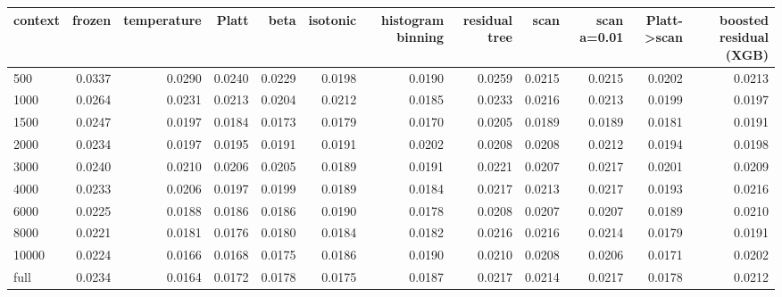 \begin{tabular}{lrrrrrrrrrrr}
\toprule
context & frozen & temperature & Platt & beta & isotonic & histogram binning & residual tree & scan & scan a=0.01 & Platt->scan & boosted residual (XGB) \\
\midrule
500 & 0.0337 & 0.0290 & 0.0240 & 0.0229 & 0.0198 & 0.0190 & 0.0259 & 0.0215 & 0.0215 & 0.0202 & 0.0213 \\
1000 & 0.0264 & 0.0231 & 0.0213 & 0.0204 & 0.0212 & 0.0185 & 0.0233 & 0.0216 & 0.0213 & 0.0199 & 0.0197 \\
1500 & 0.0247 & 0.0197 & 0.0184 & 0.0173 & 0.0179 & 0.0170 & 0.0205 & 0.0189 & 0.0189 & 0.0181 & 0.0191 \\
2000 & 0.0234 & 0.0197 & 0.0195 & 0.0191 & 0.0191 & 0.0202 & 0.0208 & 0.0208 & 0.0212 & 0.0194 & 0.0198 \\
3000 & 0.0240 & 0.0210 & 0.0206 & 0.0205 & 0.0189 & 0.0191 & 0.0221 & 0.0207 & 0.0217 & 0.0201 & 0.0209 \\
4000 & 0.0233 & 0.0206 & 0.0197 & 0.0199 & 0.0189 & 0.0184 & 0.0217 & 0.0213 & 0.0217 & 0.0193 & 0.0216 \\
6000 & 0.0225 & 0.0188 & 0.0186 & 0.0186 & 0.0190 & 0.0178 & 0.0208 & 0.0207 & 0.0207 & 0.0189 & 0.0210 \\
8000 & 0.0221 & 0.0181 & 0.0176 & 0.0180 & 0.0184 & 0.0182 & 0.0216 & 0.0216 & 0.0214 & 0.0179 & 0.0191 \\
10000 & 0.0224 & 0.0166 & 0.0168 & 0.0175 & 0.0186 & 0.0190 & 0.0210 & 0.0208 & 0.0206 & 0.0171 & 0.0202 \\
full & 0.0234 & 0.0164 & 0.0172 & 0.0178 & 0.0175 & 0.0187 & 0.0217 & 0.0214 & 0.0217 & 0.0178 & 0.0212 \\
\bottomrule
\end{tabular}
